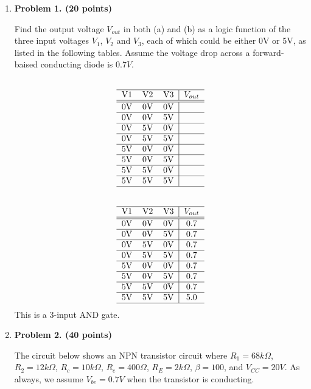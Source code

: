 \begin{enumerate}

\item {\bf Problem 1. (20 points)} 

Find the output voltage $V_{out}$ in both (a) and (b) as a logic function of 
the three input voltages $V_1$, $V_2$ and $V_3$, each of which could be either 
0V or 5V, as listed in the following tables. Assume the voltage drop across 
a forward-baised conducting diode is $0.7V$.


\[
\begin{tabular}{ccc|c}\\ \hline 
V1 & V2 & V3 & $V_{out}$ \\ \hline \hline
0V & 0V & 0V &           \\ \hline
0V & 0V & 5V &           \\ \hline
0V & 5V & 0V &           \\ \hline
0V & 5V & 5V &           \\ \hline
5V & 0V & 0V &           \\ \hline
5V & 0V & 5V &           \\ \hline
5V & 5V & 0V &           \\ \hline
5V & 5V & 5V &           \\ \hline
\end{tabular}
\]

\[
\begin{tabular}{ccc|c}\\ \hline
V1 & V2 & V3 & $V_{out}$ \\ \hline \hline
0V & 0V & 0V &  0.7      \\ \hline
0V & 0V & 5V &  0.7      \\ \hline
0V & 5V & 0V &  0.7      \\ \hline
0V & 5V & 5V &  0.7      \\ \hline
5V & 0V & 0V &  0.7      \\ \hline
5V & 0V & 5V &  0.7      \\ \hline
5V & 5V & 0V &  0.7      \\ \hline
5V & 5V & 5V &  5.0      \\ \hline
\end{tabular}
\]
This is a 3-input AND gate.

\item {\bf Problem 2. (40 points)} 

The circuit below shows an NPN transistor circuit where $R_1=68k\Omega$,
$R_2=12k\Omega$, $R_c=10k\Omega$, $R_e=400\Omega$, $R_E=2k\Omega$, 
$\beta=100$, and $V_{CC}=20V$. As always, we assume $V_{be}=0.7V$ when
the transistor is conducting.


\end{enumerate}
